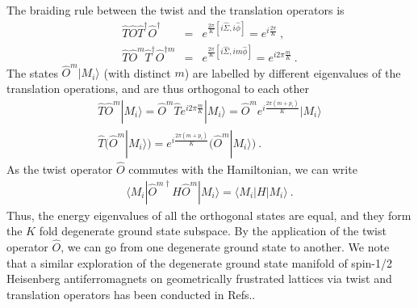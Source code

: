 \documentclass[reprint,prb,superscriptaddress]{revtex4-2}
\begin{document}
The braiding rule between the twist and the translation operators is
\begin{eqnarray}
\hat{T}\hat{O}\hat{T}^{\dagger}\hat{O}^{\dagger} &=& e^{\frac{2\pi }{K}[i\hat{\Sigma},i\hat{\phi}]}=e^{i\frac{2\pi }{K}} ~,\nonumber\\
\hat{T}\hat{O}^m\hat{T}^{\dagger}\hat{O}^{\dagger m} &=& e^{\frac{2\pi }{K}[i\hat{\Sigma},im\hat{\phi}]}=e^{i2\pi \frac{m}{K}}~.
\end{eqnarray}
The states $\hat{O}^m |M_i\rangle$ (with distinct $m$) are labelled by different eigenvalues of the translation operations, and are thus orthogonal to each other
\begin{gather}
\hat{T} \hat{O}^m |M_i\rangle = \hat{O}^m \hat{T} e^{i2\pi \frac{m}{K}} |M_i\rangle =\hat{O}^m e^{i \frac{2\pi(m+p_i)}{K} } |M_i\rangle \\
\hat{T} \bigg(\hat{O}^m |M_i\rangle \bigg) = e^{i \frac{2\pi(m+p_i)}{K} } \bigg( \hat{O}^m |M_i\rangle \bigg)~.
\end{gather}
As the twist operator $\hat{O}$ commutes with the Hamiltonian, we can write
\begin{eqnarray}
\langle M_i| \hat{O}^{m \dagger}  H \hat{O}^m |M_i\rangle =\langle M_i|  H |M_i\rangle ~.
\end{eqnarray}
Thus, the energy eigenvalues of all the orthogonal states are equal, and they form the $K$ fold degenerate ground state subspace. By the application of the twist operator $\hat{O}$, we can go from one degenerate ground state to another. We note that a similar exploration of the degenerate ground state manifold of spin-1/2 Heisenberg antiferromagnets on geometrically frustrated lattices via twist and translation operators has been conducted in Refs.\cite{pal2019magnetization,pal2020topological}. 
\end{document}
